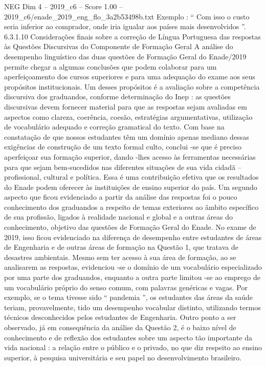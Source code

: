 \begin{textsample}{NEG Dim 4 – 2019\_c6 – Score 1.00 – 2019\_c6/enade\_2019\_eng\_flo\_3a2b53498b.txt}
Exemplo : “ Com isso o custo seria inferior ao comprador, onde iria igualar aos países mais desenvolvidos ”. 6.3.1.10 Considerações finais sobre a correção de Língua Portuguesa das respostas às Questões Discursivas do Componente de Formação Geral A análise do desempenho linguístico das duas questões de Formação Geral do Enade/2019 permite chegar a algumas conclusões que podem colaborar para um aperfeiçoamento dos cursos superiores e para uma adequação do exame aos seus propósitos institucionais.
Um desses propósitos é a avaliação sobre a competência discursiva dos graduandos, conforme determinação do Inep : as questões discursivas devem fornecer material para que as respostas sejam avaliadas em aspectos como clareza, coerência, coesão, estratégias argumentativas, utilização de vocabulário adequado e correção gramatical do texto.
Com base na constatação de que nossos estudantes têm um domínio apenas mediano dessas exigências de construção de um texto formal culto, conclui -se que é preciso aperfeiçoar sua formação superior, dando -lhes acesso às ferramentas necessárias para que sejam bem-sucedidos nas diferentes situações de sua vida cidadã – profissional, cultural e política.
Essa é uma contribuição efetiva que os resultados do Enade podem oferecer às instituições de ensino superior do país.
Um segundo aspecto que ficou evidenciado a partir da análise das respostas foi o pouco conhecimento dos graduandos a respeito de temas exteriores ao âmbito específico de sua profissão, ligados à realidade nacional e global e a outras áreas do conhecimento, objetivo das questões de Formação Geral do Enade.
No exame de 2019, isso ficou evidenciado na diferença de desempenho entre estudantes de áreas de Engenharia e de outras áreas de formação na Questão 1, que tratava de desastres ambientais.
Mesmo sem ter acesso à sua área de formação, ao se analisarem as respostas, evidenciou -se o domínio de um vocabulário especializado por uma parte dos graduandos, enquanto a outra parte limitou -se ao emprego de um vocabulário próprio do senso comum, com palavras genéricas e vagas.
Por exemplo, se o tema tivesse sido “ pandemia ”, os estudantes das áreas da saúde teriam, provavelmente, tido um desempenho vocabular distinto, utilizando termos técnicos desconhecidos pelos estudantes de Engenharia.
Outro ponto a ser observado, já em consequência da análise da Questão 2, é o baixo nível de conhecimento e de reflexão dos estudantes sobre um aspecto tão importante da vida nacional : a relação entre o público e o privado, no que diz respeito ao ensino superior, à pesquisa universitária e seu papel no desenvolvimento brasileiro.

\end{textsample}

